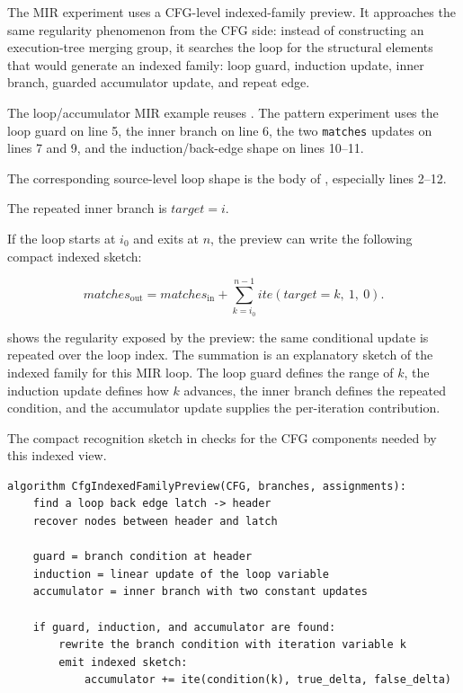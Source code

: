 \documentclass[conference]{IEEEtran}
\newcommand{\ite}{\mathit{ite}}
\begin{document}
The MIR experiment uses a CFG-level indexed-family preview. It approaches the
same regularity phenomenon from the CFG side: instead of constructing an
execution-tree merging group, it searches the loop for the structural elements
that would generate an indexed family: loop guard, induction update, inner
branch, guarded accumulator update, and repeat edge.

The loop/accumulator MIR example reuses . The
pattern experiment uses the loop guard on line 5, the inner branch on line 6, the
two \texttt{matches} updates on lines 7 and 9, and the induction/back-edge
shape on lines 10--11.

The corresponding source-level loop shape is the body of
, especially lines 2--12.

The repeated inner branch is \(\mathit{target} = i\).

If the loop starts at \(i_0\) and exits at \(n\), the preview can write the
following compact indexed sketch:

\begin{equation}
\label{eq:quantified-matches}
\mathit{matches}_{\mathrm{out}}
=
\mathit{matches}_{\mathrm{in}}
+
\sum_{k=i_0}^{n-1}
\ite(\mathit{target} = k,\ 1,\ 0).
\end{equation}

 shows the regularity exposed by the preview: the
same conditional update is repeated over the loop index. The summation is an
explanatory sketch of the indexed family for this MIR loop. The loop guard
defines the range of \(k\), the induction update defines how \(k\) advances,
the inner branch defines the repeated condition, and the accumulator update
supplies the per-iteration contribution.

The compact recognition sketch in  checks
for the CFG components needed by this indexed view.

\begin{lstlisting}[style=pseudo,caption={CFG-level indexed-family preview.},label={lst:cfg-indexed-family-preview}]
algorithm CfgIndexedFamilyPreview(CFG, branches, assignments):
    find a loop back edge latch -> header
    recover nodes between header and latch

    guard = branch condition at header
    induction = linear update of the loop variable
    accumulator = inner branch with two constant updates

    if guard, induction, and accumulator are found:
        rewrite the branch condition with iteration variable k
        emit indexed sketch:
            accumulator += ite(condition(k), true_delta, false_delta)
\end{lstlisting}
\end{document}
